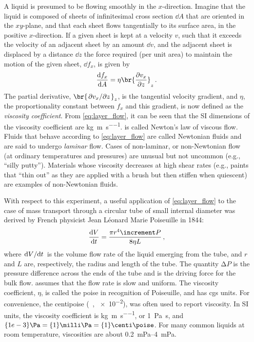 \documentclass[nobib,nofonts,nols,nohyper]{tufte-handout}
\begin{document}
A liquid is presumed to be flowing smoothly in the \( x \)-direction. 
Imagine that the liquid is composed of sheets of infinitesimal cross section \( \dd{A} \) that are oriented in the \( xy \)-plane, and that each sheet flows tangentially to its surface area, in the positive \( x \)-direction. 
If a given sheet is kept at a velocity \( v \), such that it exceeds the velocity of an adjacent sheet by an amount \( \dd{v} \), and the adjacent sheet is displaced by a distance \( \dd{z} \) the force required (per unit area) to maintain the motion of the given sheet, \( \dd{f_x} \), is given by
\begin{equation}
	\dv{f_x}{A} = \eta \br{ \pdv{v_x}{z}}_z \, .
	\label{eq:layer_flow}
\end{equation}
The partial derivative, \( \br{\pdv*{v_x}{z}}_z \), is the tangential velocity gradient, and \( \eta \), the proportionality constant between \( f_x \) and this gradient, is now defined as the \emph{viscosity coefficient}. 
From \cref{eq:layer_flow}, it can be seen that the SI dimensions of the viscosity coefficient are \unit{\kg \per \m \per \s}.  is called Newton's law of viscous flow. 
Fluids that behave according to \cref{eq:layer_flow} are called Newtonian fluids and are said to undergo \emph{laminar} flow. 
Cases of non-laminar, or non-Newtonian flow (at ordinary temperatures and pressures) are unusual but not uncommon (e.g., ``silly putty'').
Materials whose viscosity decreases at high shear rates (e.g., paints that ``thin out'' as they are applied with a brush but then stiffen when quiescent) are examples of non-Newtonian fluids.

With respect to this experiment, a useful application of \cref{eq:layer_flow} to the case of mass transport through a circular tube of small internal diameter was derived by French physicist Jean Léonard Marie Poiseuille in 1844:
\begin{equation}
	\dv{V}{t} = \frac{\pi r^4 \increment P}{8 \eta L} \, ,
	\label{eq:tube_flow}
\end{equation}
where \( \dv*{V}{t} \) is the volume flow rate of the liquid emerging from the tube, and \( r \) and \( L \) are, respectively, the radius and length of the tube.
The quantity \( \increment P \) is the pressure difference across the ends of the tube and is the driving force for the bulk flow. 
 assumes that the flow rate is slow and uniform. 
The viscosity coefficient, \( \eta \), is called the poise in recognition of Poiseuille, and has cgs units.
For convenience, the centipoise (\unit{\centi\poise}, \qty{e-2}{\poise}), was often used to report viscosity. 
In SI units, the viscosity coefficient is \unit{\kg \per\m \per\s}, or \qty{1}{\Pa \s}, and \( \qty{1e-3}{\Pa} = \qty{1}{\milli\Pa} = \qty{1}{\centi\poise} \).
For many common liquids at room temperature, viscosities are about \qtyrange{0.2}{4}{\milli\Pa}. 
\end{document}
